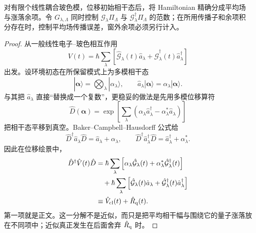 \begin{proposition}[多模相干平均场的有限时间误差]
对有限个线性耦合玻色模，位移初始相干态后，将 Hamiltonian 精确分成平均场与涨落余项。令 $G_{\lambda,\Lambda}$ 同时控制 $\mathcal G_\lambda\Pi_\Lambda$ 与 $\mathcal G_\lambda^\dagger\Pi_\Lambda$ 的范数；在所用传播子和余项积分存在时，控制平均场传播误差，窗外余项必须另行计入。
\end{proposition}
\begin{proof}
从一般线性电子--玻色相互作用
\[
\hat V(t)
=\hbar\sum_\lambda
\left[
\hat{\mathcal G}_\lambda(t)\hat a_\lambda
+\hat{\mathcal G}_\lambda^\dagger(t)\hat a_\lambda^\dagger
\right]
\]
出发。设环境初态在所保留模式上为多模相干态
\[
|\boldsymbol\alpha\rangle
=\bigotimes_\lambda|\alpha_\lambda\rangle,
\qquad
\hat a_\lambda|\boldsymbol\alpha\rangle
=\alpha_\lambda|\boldsymbol\alpha\rangle .
\]
与其把 $\hat a_\lambda$ 直接“替换成一个复数”，更稳妥的做法是先用多模位移算符
\[
\hat D(\boldsymbol\alpha)
=\exp\!\left[
\sum_\lambda
(\alpha_\lambda\hat a_\lambda^\dagger-\alpha_\lambda^*\hat a_\lambda)
\right]
\]
把相干态平移到真空。Baker--Campbell--Hausdorff 公式给
\[
\hat D^\dagger\hat a_\lambda\hat D
=\hat a_\lambda+\alpha_\lambda,
\qquad
\hat D^\dagger\hat a_\lambda^\dagger\hat D
=\hat a_\lambda^\dagger+\alpha_\lambda^* .
\]
因此在位移绘景中，
\begin{align*}
\hat D^\dagger\hat V(t)\hat D
&=
\hbar\sum_\lambda
\left[
\alpha_\lambda\hat{\mathcal G}_\lambda(t)
+\alpha_\lambda^*\hat{\mathcal G}_\lambda^\dagger(t)
\right]\\
&\quad+
\hbar\sum_\lambda
\left[
\hat{\mathcal G}_\lambda(t)\hat a_\lambda
+\hat{\mathcal G}_\lambda^\dagger(t)\hat a_\lambda^\dagger
\right]\\
&\equiv
\hat V_{\rm cl}(t)+\hat R_{\rm q}(t).
\end{align*}
第一项就是正文。这一分解不是近似，而只是把平均相干幅与围绕它的量子涨落放在不同项中；近似真正发生在后面舍弃 $\hat R_{\rm q}$ 时。


\end{proof}
